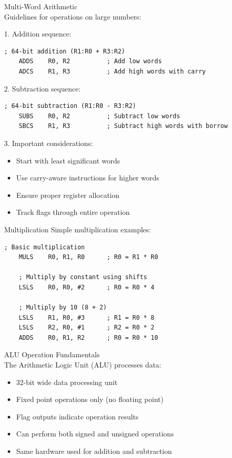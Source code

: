 \begin{KR}{Multi-Word Arithmetic}\\
Guidelines for operations on large numbers:

1. Addition sequence:
\begin{lstlisting}[language=armasm, style=base]
    ; 64-bit addition (R1:R0 + R3:R2)
    ADDS    R0, R2          ; Add low words
    ADCS    R1, R3          ; Add high words with carry
\end{lstlisting}

2. Subtraction sequence:
\begin{lstlisting}[language=armasm, style=base]
    ; 64-bit subtraction (R1:R0 - R3:R2)
    SUBS    R0, R2          ; Subtract low words
    SBCS    R1, R3          ; Subtract high words with borrow
\end{lstlisting}

3. Important considerations:
\begin{itemize}
  \item Start with least significant words
  \item Use carry-aware instructions for higher words
  \item Ensure proper register allocation
  \item Track flags through entire operation
\end{itemize}
\end{KR}

\begin{example2}{Multiplication}
Simple multiplication examples:
\begin{lstlisting}[language=armasm, style=base]
    ; Basic multiplication
    MULS    R0, R1, R0      ; R0 = R1 * R0
    
    ; Multiply by constant using shifts
    LSLS    R0, R0, #2      ; R0 = R0 * 4
    
    ; Multiply by 10 (8 + 2)
    LSLS    R1, R0, #3      ; R1 = R0 * 8
    LSLS    R2, R0, #1      ; R2 = R0 * 2
    ADDS    R0, R1, R2      ; R0 = R0 * 10
\end{lstlisting}
\end{example2}

\begin{concept}{ALU Operation Fundamentals}\\
The Arithmetic Logic Unit (ALU) processes data:
\begin{itemize}
  \item 32-bit wide data processing unit
  \item Fixed point operations only (no floating point)
  \item Flag outputs indicate operation results
  \item Can perform both signed and unsigned operations
  \item Same hardware used for addition and subtraction
\end{itemize}
\end{concept}

